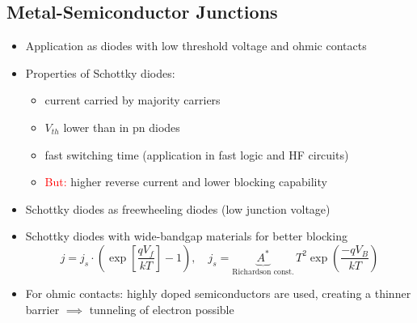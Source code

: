 \subsection{Metal-Semiconductor Junctions}
\begin{itemize}
  \item Application as diodes with low threshold voltage and ohmic contacts
  \item Properties of Schottky diodes:
        \begin{itemize}
          \item current carried by majority carriers
          \item $V_{th}$ lower than in pn diodes
          \item fast switching time (application in fast logic and HF circuits)
          \item \textcolor{red}{But:} higher reverse current and lower blocking capability
        \end{itemize}
  \item Schottky diodes as freewheeling diodes (low junction voltage)
  \item Schottky diodes with wide-bandgap materials for better blocking
        \begin{equation*}
          j = j_{s} \cdot \left(\exp\left[\dfrac{qV_{f}}{kT}\right] - 1\right), \quad j_{s} = \underbrace{A^{*}}_{\text{Richardson const.}}\, T^{2} \exp\left(\dfrac{-q V_{B}}{kT}\right)
        \end{equation*}
    \item For ohmic contacts: highly doped semiconductors are used, creating a thinner barrier $\implies$ tunneling of electron possible
\end{itemize}

